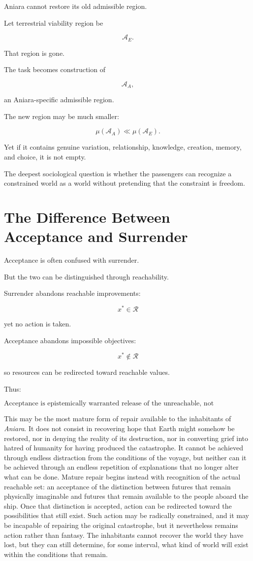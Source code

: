 \documentclass[11pt,oneside]{book}
\theoremstyle{definition}
\theoremstyle{remark}
\newcommand{\A}{\mathcal{A}}
\newcommand{\R}{\mathcal{R}}
\begin{document}
Aniara cannot restore its old admissible region.

Let terrestrial viability region be

\[
\A_E.
\]

That region is gone.

The task becomes construction of

\[
\A_A,
\]

an Aniara-specific admissible region.

The new region may be much smaller:

\[
\mu(\A_A)
\ll
\mu(\A_E).
\]

Yet if it contains genuine variation, relationship, knowledge, creation, memory, and choice, it is not empty.

The deepest sociological question is whether the passengers can recognize a constrained world as a world without pretending that the constraint is freedom.

\section{The Difference Between Acceptance and Surrender}

Acceptance is often confused with surrender.

But the two can be distinguished through reachability.

Surrender abandons reachable improvements:

\[
x^\ast\in\R
\]

yet no action is taken.

Acceptance abandons impossible objectives:

\[
x^\ast\notin\R
\]

so resources can be redirected toward reachable values.

Thus:

\[
\boxed{
\text{Acceptance is epistemically warranted release of the unreachable, not abandonment of the reachable.}
}
\]

This may be the most mature form of repair available to the inhabitants of \emph{Aniara}. It does not consist in recovering hope that Earth might somehow be restored, nor in denying the reality of its destruction, nor in converting grief into hatred of humanity for having produced the catastrophe. It cannot be achieved through endless distraction from the conditions of the voyage, but neither can it be achieved through an endless repetition of explanations that no longer alter what can be done. Mature repair begins instead with recognition of the actual reachable set: an acceptance of the distinction between futures that remain physically imaginable and futures that remain available to the people aboard the ship. Once that distinction is accepted, action can be redirected toward the possibilities that still exist. Such action may be radically constrained, and it may be incapable of repairing the original catastrophe, but it nevertheless remains action rather than fantasy. The inhabitants cannot recover the world they have lost, but they can still determine, for some interval, what kind of world will exist within the conditions that remain.
\end{document}
